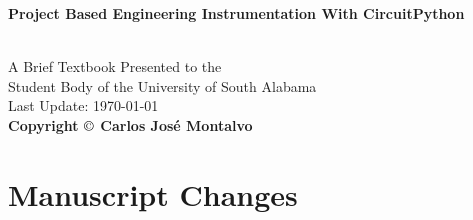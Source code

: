 \documentclass{article}
\begin{document}
\begin{center}
\begin{LARGE}{\bf Project Based Engineering Instrumentation With CircuitPython}\end{LARGE}\\
\large
\vspace{22 mm}
   A Brief Textbook Presented to the \\ 
   Student Body of the University of South Alabama \\
\vspace{22 mm}
\vspace{22 mm}
\vspace{22 mm}
       Last Update: \today\\
{\bf Copyright $\copyright$ Carlos Jos\'{e} Montalvo}
\end{center}

\linespread{1}

\newpage

\section*{Manuscript Changes}
\end{document}

